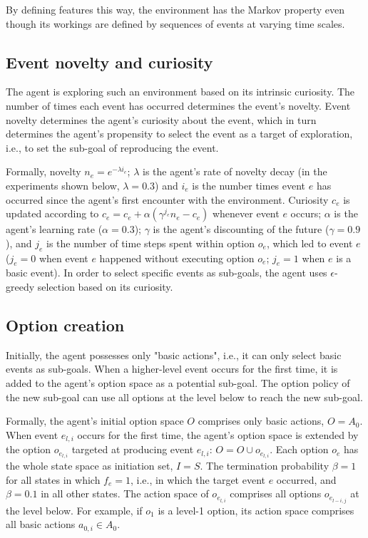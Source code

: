 \documentclass{article}
\begin{document}
By defining features this way, the environment has the Markov property even though its workings are defined by sequences of events at varying time scales. 


\subsection{Event novelty and curiosity}

The agent is exploring such an environment based on its intrinsic curiosity. The number of times each event has occurred determines the event's novelty. Event novelty determines the agent's curiosity about the event, which in turn determines the agent's propensity to select the event as a target of exploration, i.e., to set the sub-goal of reproducing the event.

Formally, novelty $n_e = e^{-\lambda i_e}$; $\lambda$ is the agent's rate of novelty decay (in the experiments shown below, $\lambda = 0.3$) and $i_e$ is the number times event $e$ has occurred since the agent's first encounter with the environment.
Curiosity $c_e$ is updated according to $c_e = c_e + \alpha (\gamma^{j_e} n_e - c_e)$ whenever event $e$ occurs; $\alpha$ is the agent's learning rate ($\alpha = 0.3$); $\gamma$ is the agent's discounting of the future ($\gamma = 0.9$), and $j_e$ is the number of time steps spent within option $o_e$, which led to event $e$ ($j_e = 0$ when event $e$ happened without executing option $o_e$; $j_e = 1$ when $e$ is a basic event).
In order to select specific events as sub-goals, the agent uses $\epsilon$-greedy selection based on its curiosity.

\subsection{Option creation}

Initially, the agent possesses only "basic actions", i.e., it can only select basic events as sub-goals. When a higher-level event occurs for the first time, it is added to the agent's option space as a potential sub-goal. The option policy of the new sub-goal can use all options at the level below to reach the new sub-goal.

Formally, the agent's initial option space $O$ comprises only basic actions, $O = A_0$. When event $e_{l, i}$ occurs for the first time, the agent's option space is extended by the option $o_{e_{l, i}}$ targeted at producing event $e_{l, i}$: $O = O \cup o_{e_{l, i}}$. Each option $o_e$ has the whole state space as initiation set, $I = S$. The termination probability $\beta = 1$ for all states in which $f_e = 1$, i.e., in which the target event $e$ occurred, and $\beta = 0.1$ in all other states. The action space of $o_{e_{l, i}}$ comprises all options $o_{e_{l-i, j}}$ at the level below. For example, if $o_1$ is a level-1 option, its action space comprises all basic actions $a_{0, i} \in A_0$. 
\end{document}
